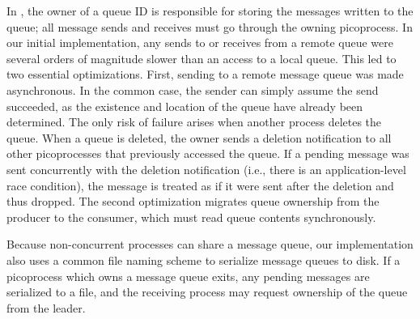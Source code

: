\vspace{5pt}
 In \sysname{}, the owner of a queue ID is responsible for 
storing the messages written to the queue; all message sends and receives must 
go through the owning picoprocess.  
In our initial implementation, any sends to or receives from a remote queue were several
orders of magnitude slower than an access to a local queue.
This led to two essential optimizations.  
First, sending to a remote
message queue was made asynchronous.  In the common case, the sender can simply assume 
the send succeeded, as the existence and location of the queue have already been determined.
The only risk of failure arises when another process deletes the queue.
When a queue is deleted, the owner sends a deletion notification to all other picoprocesses
that previously accessed the queue.
If a pending message was sent concurrently with the deletion notification 
(i.e., there is an application-level race condition), 
the message is treated as if it were sent after the deletion and thus dropped.
The second optimization migrates queue ownership from the producer to the consumer,
which must read queue contents synchronously.


Because non-concurrent processes can share a message queue,
our implementation also uses a common file naming scheme to serialize message queues to disk.
If a picoprocess which owns a message queue exits, 
any pending messages are serialized to a file,
and the receiving process may request ownership of the queue from the leader.



